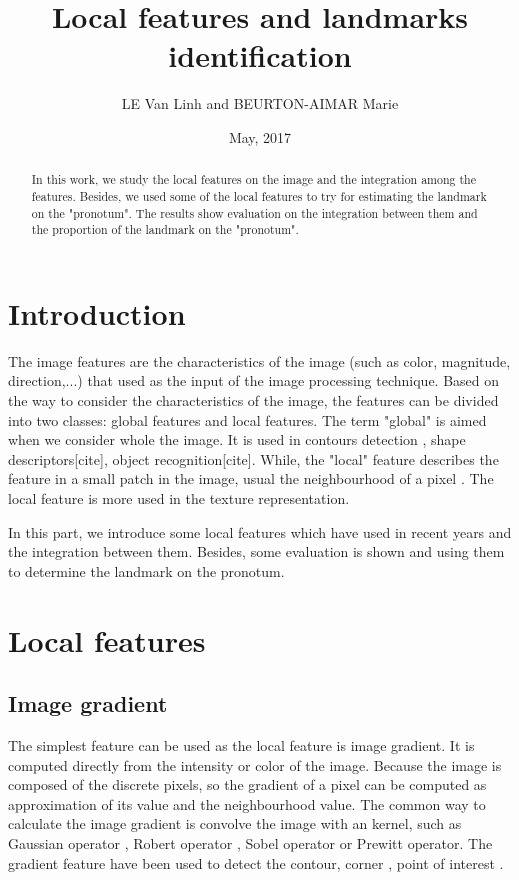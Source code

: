 \documentclass[12pt,a4paper]{article}
\begin{document}
\title{Local features and landmarks identification}
\author{LE Van Linh and BEURTON-AIMAR Marie}
\date{May, 2017}
\maketitle
\begin{abstract}

	In this work, we study the local features on the image and the integration among the features. Besides, we used some of the local features to try for estimating the landmark on the "pronotum". The results show evaluation on the integration between them and the proportion of the landmark on the "pronotum".

\end{abstract}
\section{Introduction}
The image features are the characteristics of the image (such as color, magnitude, direction,...) that used as the input of the image processing technique. Based on the way to consider the characteristics of the image, the features can be divided into two classes: global features and local features. The term "global" is aimed when we consider whole the image. It is used in contours detection \cite{canny1986computational, smith1997susan}, shape descriptors[cite], object recognition[cite]. While, the "local" feature describes the feature in a small patch in the image, usual the neighbourhood of a pixel \cite{lowe2004distinctive}. The local feature is more used in the texture representation.

In this part, we introduce some local features which have used in recent years and the integration between them. Besides, some evaluation is shown and using them to determine the landmark on the pronotum.

\section{Local features}

\subsection{Image gradient}
The simplest feature can be used as the local feature is image gradient. It is computed directly from the intensity or color of the image. Because the image is composed of the discrete pixels, so the gradient of a pixel can be computed as approximation of its value and the neighbourhood value. The common way to calculate the image gradient is convolve the image with an kernel, such as Gaussian operator \cite{maini2009study}, Robert operator \cite{maini2009study}, Sobel operator \cite{maini2009study} or Prewitt operator\cite{maini2009study}. The gradient feature have been used to detect the contour\cite{canny1986computational}, corner \cite{smith1997susan}, point of interest \cite{lowe2004distinctive}.
\end{document}
